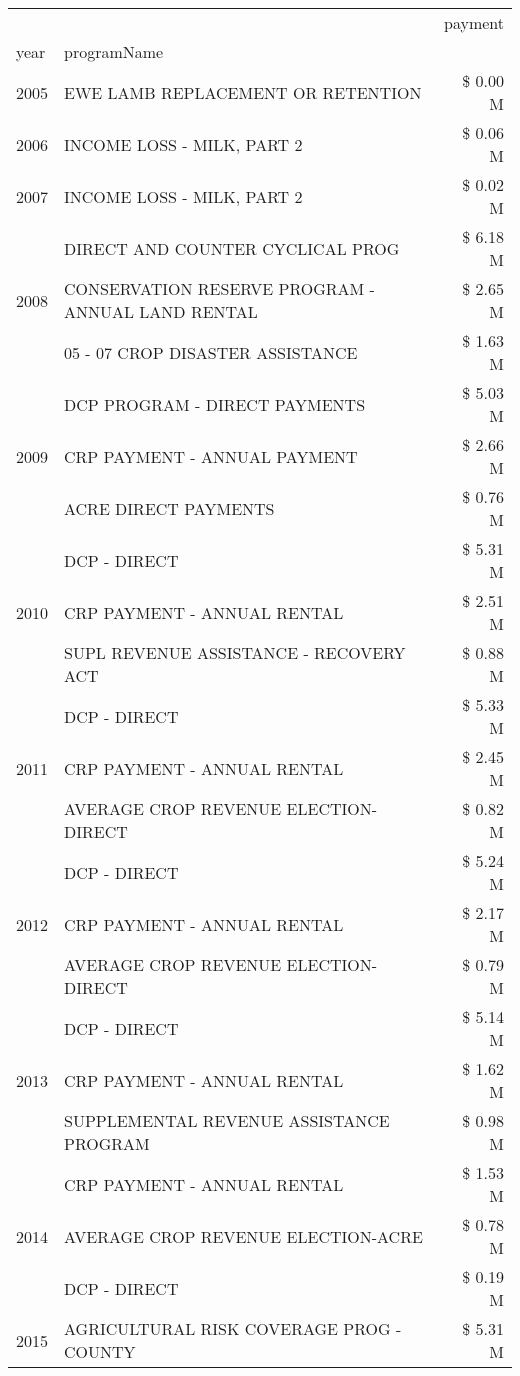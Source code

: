 \begin{tabular}{llr}
\toprule
 &  & payment \\
year & programName &  \\
\midrule
2005 & EWE LAMB REPLACEMENT OR RETENTION & \$ 0.00 M \\
\cline{1-3}
2006 & INCOME LOSS - MILK, PART 2 & \$ 0.06 M \\
\cline{1-3}
2007 & INCOME LOSS - MILK, PART 2 & \$ 0.02 M \\
\cline{1-3}
\multirow[t]{3}{*}{2008} & DIRECT AND COUNTER CYCLICAL PROG & \$ 6.18 M \\
 & CONSERVATION RESERVE PROGRAM - ANNUAL LAND RENTAL & \$ 2.65 M \\
 & 05 - 07 CROP DISASTER ASSISTANCE & \$ 1.63 M \\
\cline{1-3}
\multirow[t]{3}{*}{2009} & DCP PROGRAM - DIRECT PAYMENTS & \$ 5.03 M \\
 & CRP PAYMENT - ANNUAL PAYMENT & \$ 2.66 M \\
 & ACRE DIRECT PAYMENTS & \$ 0.76 M \\
\cline{1-3}
\multirow[t]{3}{*}{2010} & DCP - DIRECT & \$ 5.31 M \\
 & CRP PAYMENT - ANNUAL RENTAL & \$ 2.51 M \\
 & SUPL REVENUE ASSISTANCE - RECOVERY ACT & \$ 0.88 M \\
\cline{1-3}
\multirow[t]{3}{*}{2011} & DCP - DIRECT & \$ 5.33 M \\
 & CRP PAYMENT - ANNUAL RENTAL & \$ 2.45 M \\
 & AVERAGE CROP REVENUE ELECTION-DIRECT & \$ 0.82 M \\
\cline{1-3}
\multirow[t]{3}{*}{2012} & DCP - DIRECT & \$ 5.24 M \\
 & CRP PAYMENT - ANNUAL RENTAL & \$ 2.17 M \\
 & AVERAGE CROP REVENUE ELECTION-DIRECT & \$ 0.79 M \\
\cline{1-3}
\multirow[t]{3}{*}{2013} & DCP - DIRECT & \$ 5.14 M \\
 & CRP PAYMENT - ANNUAL RENTAL & \$ 1.62 M \\
 & SUPPLEMENTAL REVENUE ASSISTANCE PROGRAM & \$ 0.98 M \\
\cline{1-3}
\multirow[t]{3}{*}{2014} & CRP PAYMENT - ANNUAL RENTAL & \$ 1.53 M \\
 & AVERAGE CROP REVENUE ELECTION-ACRE & \$ 0.78 M \\
 & DCP - DIRECT & \$ 0.19 M \\
\cline{1-3}
\multirow[t]{3}{*}{2015} & AGRICULTURAL RISK COVERAGE PROG - COUNTY & \$ 5.31 M \\

\end{tabular}
